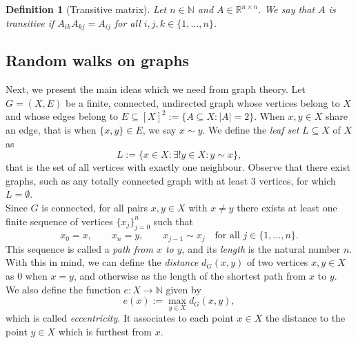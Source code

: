 \documentclass[a4paper,11pt,oneside]{amsart}
\newtheorem{definition}[theorem]{Definition}
\newcommand{\R}{{\mathbb R}}
\newcommand{\N}{{\mathbb N}}
\begin{document}
\begin{definition}[Transitive matrix]
    Let $n\in \N$ and $A\in \R^{n\times n}$. We say that $A$ is \emph{transitive} if $A_{ik}A_{kj}=A_{ij}$ for all $i,j,k\in\{1,...,n\}$.
\end{definition}

\subsection{Random walks on graphs} Next, we present the main ideas which we need from graph theory. Let $G=(X,E)$ be a finite, connected, undirected graph whose vertices belong to $X$ and whose edges belong to $E\subseteq [X]^2:= \{A\subseteq X : |A|=2\}$. When $x,y\in X$ share an edge, that is when $\{x,y\}\in E$, we say $x\sim y$. We define the \emph{leaf set} $L\subseteq X$ of $X$ as $$L:= \{x\in X: \exists ! y\in X : y\sim x\},$$
that is the set of all vertices with exactly one neighbour. Observe that there exist graphs, such as any totally connected graph with at least $3$ vertices, for which $L=\emptyset$. \\

Since $G$ is connected, for all pairs $x,y\in X$ with $x\neq y$ there exists at least one finite sequence of vertices $\{x_j\}_{j=0}^n$ such that $$ x_0=x, \qquad x_n=y, \qquad x_{j-1}\sim x_{j} \quad \mbox{for all } j\in\{1,...,n\}.  $$ This sequence is called a \emph{path from $x$ to $y$}, and its \emph{length} is the natural number $n$. With this in mind, we can define the \emph{distance} $d_G(x,y)$ of two vertices $x,y\in X$ as $0$ when $x=y$, and otherwise as the length of the shortest path from $x$ to $y$. We also define the function $e: X\rightarrow \N$ given by $$ e(x) := \max_{y\in X} d_G(x,y),$$ which is called \emph{eccentricity}. It associates to each point $x\in X$ the distance to the point $y\in X$ which is furthest from $x$. \\
\end{document}
